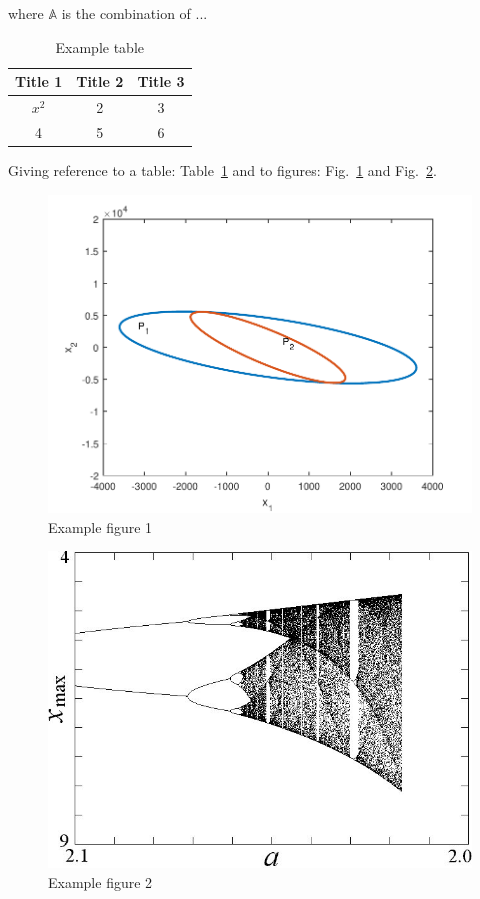 \documentclass[letterpaper,12pt]{article}
\begin{document}
\noindent
where $\mathbf{\mathbb{A}}$ is the combination of ... \lipsum[2]

\begin{table}   %
\caption{Example table}
\label{tbl:exampleTable}
\centering   %
\begin{tabular}{c c c} %
\toprule \toprule
Title 1 & {\bf Title 2} & Title 3 \\ \hline
$x^2$        & 2              & 3        \\
4        & 5              & 6        \\ \bottomrule
\end{tabular}
\end{table}

Giving reference to a table: Table~\ref{tbl:exampleTable} and to figures: Fig.~\ref{fig:example1} and Fig.~\ref{fig:example2}.

\begin{figure}
\centering
\includegraphics[width = 0.67\linewidth]{figs/switch2to1.pdf} %
\caption{Example figure 1}
\label{fig:example1}
\end{figure}

\begin{figure}
\centering
\includegraphics[width = 0.4\linewidth]{figs/bifurcation.jpg} %
\caption{Example figure 2}
\label{fig:example2}
\end{figure}
\end{document}
